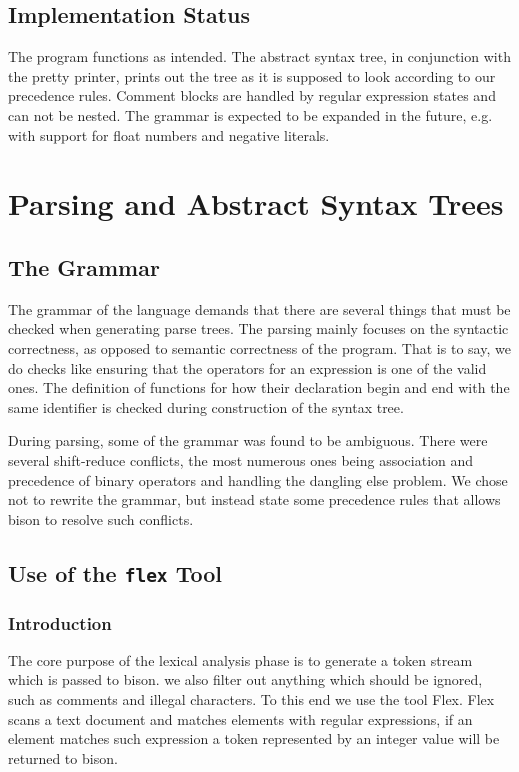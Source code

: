 \documentclass{article}
\begin{document}
\subsection{Implementation Status}
The program functions as intended. The abstract syntax tree, in conjunction with the pretty printer, prints out the tree as it is supposed to look according to our precedence rules. Comment blocks are handled by regular expression states and can not be nested. The grammar is expected to be expanded in the future, e.g. with support for float numbers and negative literals.
 
\section{Parsing and Abstract Syntax Trees}

\subsection{The Grammar}
The grammar of the language demands that there are several things that must be checked when generating parse trees. The parsing mainly focuses on the syntactic correctness, as opposed to semantic correctness of the program. That is to say, we do checks like ensuring that the operators for an expression is one of the valid ones. The definition of functions for how their declaration begin and end with the same identifier is checked during construction of the syntax tree.

During parsing, some of the grammar was found to be ambiguous. There were several shift-reduce conflicts, the most numerous ones being association and precedence of binary operators and handling the dangling else problem. We chose not to rewrite the grammar, but instead state some precedence rules that allows bison to resolve such conflicts.

\subsection{Use of the {\tt flex} Tool}
\subsubsection*{Introduction}
The core purpose of the lexical analysis phase is to generate a token stream which is passed to bison.
we also filter out anything which should be ignored, such as comments and illegal characters. To this end we use the tool Flex.\newline
Flex scans a text document and matches elements with regular expressions, if an element matches such expression a token represented by an integer value will be returned to bison.\newline
\end{document}
